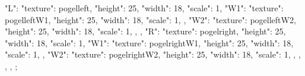 {{{      "L": {
        "texture": pogelleft,
        "height": 25,
        "width": 18,
        "scale": 1,
        "W1": {
          "texture": pogelleftW1,
          "height": 25,
          "width": 18,
          "scale": 1,
        },
        "W2": {
          "texture": pogelleftW2,
          "height": 25,
          "width": 18,
          "scale": 1,
        },
      },
      "R": {
        "texture": pogelright,
        "height": 25,
        "width": 18,
        "scale": 1,
        "W1": {
          "texture": pogelrightW1,
          "height": 25,
          "width": 18,
          "scale": 1,
        },
        "W2": {
          "texture": pogelrightW2,
          "height": 25,
          "width": 18,
          "scale": 1,
        },
      },
    },
  },
};